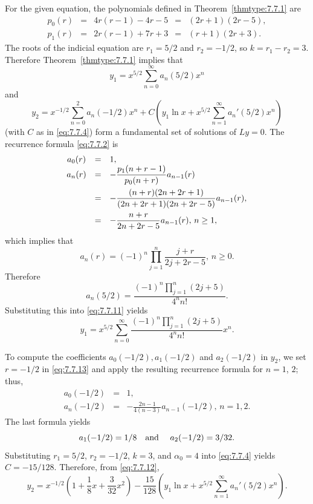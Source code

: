 \begin{examplesolution}
\solution For the given equation, the polynomials defined in Theorem~\ref{thmtype:7.7.1} are
\[
  \begin{array}{ccccc}
    p_{0}(r) & = & 4r(r-1)-4r-5 & = & (2r+1)(2r-5), \\[5pt]
    p_{1}(r) & = & 2r(r-1)+7r+3 & = & (r+1)(2r+3).
  \end{array}
\]
The roots of the indicial equation are $r_{1}=5/2$ and $r_{2}=-1/2$, so $k=r_{1}-r_{2}=3$. Therefore
Theorem~\ref{thmtype:7.7.1} implies that
\begin{equation}
  \label{eq:7.7.11}y_{1}=x^{5/2}\sum_{n=0}^{\infty}a_{n}(5/2)x^{n}
\end{equation}
and
\begin{equation}
  \label{eq:7.7.12}y_{2}=x^{-1/2}\sum_{n=0}^{2}a_{n}(-1/2)x^{n}+C\left(y_{1}\ln x+x^{5/2}\sum_{n=1}^{\infty}a_{n}'(5/2)x^{n}\right)
\end{equation}
(with $C$ as in \eqref{eq:7.7.4}) form a fundamental set of solutions of $Ly=0$. The recurrence
formula \eqref{eq:7.7.2} is
\begin{equation}
  \label{eq:7.7.13}
  \begin{array}{ccl}
    a_{0}(r) & = & 1,                                                        \\
    a_{n}(r) & = & -\displaystyle\frac{p_{1}(n+r-1)}{p_{0}(n+r)}a_{n-1}(r)            \\[10pt]
             & = & -\displaystyle\frac{(n+r)(2n+2r+1)}{(2n+2r+1)(2n+2r-5)}a_{n-1}(r), \\[10pt]
             & = & -\displaystyle\frac{n+r}{2n+2r-5}a_{n-1}(r),\,n\ge1,
  \end{array}
\end{equation}
which implies that
\begin{equation}
  \label{eq:7.7.14}a_{n}(r)=(-1)^{n}\prod_{j=1}^{n}\frac{j+r}{2j+2r-5},\,n\ge0.
\end{equation}
Therefore
\begin{equation}
  \label{eq:7.7.15}a_{n}(5/2)=\frac{(-1)^{n}\prod_{j=1}^{n}(2j+5)}{4^{n}n!}.
\end{equation}
Substituting this into \eqref{eq:7.7.11} yields
\[
  y_{1}=x^{5/2}\sum_{n=0}^{\infty}\frac{(-1)^{n}\prod_{j=1}^{n}(2j+5)}{4^{n}n!}x^{n}.
\]

To compute the coefficients $a_{0}(-1/2),a_{1}(-1/2)$ and $a_{2}(-1/2)$ in $y_{2}$, we set $r=-1/2$
in \eqref{eq:7.7.13} and apply the resulting recurrence formula for $n=1$, $2$; thus,
\begin{eqnarray*}
  a_{0}(-1/2) & = & 1, \\
  a_{n}(-1/2) & = & -\frac{2n-1}{4(n-3)}a_{n-1}(-1/2),\,n=1,2.
\end{eqnarray*}
The last formula yields
\[
  a_{1}(-1/2)=1/8\text{\quad and \quad}a_{2}(-1/2)=3/32.
\]
Substituting $r_{1}=5/2$, $r_{2}=-1/2$, $k=3$, and $\alpha_{0}=4$ into \eqref{eq:7.7.4} yields
$C=-15/128$. Therefore, from \eqref{eq:7.7.12},
\begin{equation}
  \label{eq:7.7.16}y_{2}=x^{-1/2}\left(1+\frac{1}{8}x+\frac{3}{32}x^{2}\right) -\frac{15}{128}\left(y_{1}\ln x+x^{5/2}\sum_{n=1}^{\infty}a_{n}'(5/2)x^{n}\right).
\end{equation}


\end{examplesolution}
